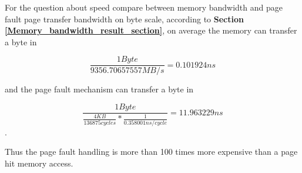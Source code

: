 For the question about speed compare between memory bandwidth and page fault page transfer bandwidth on byte scale, according to \textbf{Section \ref{Memory_bandwidth_result_section}}, on average the memory can transfer a byte in

$$\frac{1 Byte}{9356.70657557 MB/s} = 0.101924 ns $$

and the page fault mechanism can transfer a byte in

$$\frac{1 Byte}{\frac{4 KB}{136875 cycles} * \frac{1}{0.358001 ns/cycle}} = 11.963229 ns $$.

Thus the page fault handling is more than 100 times more expensive than a page hit memory access.
